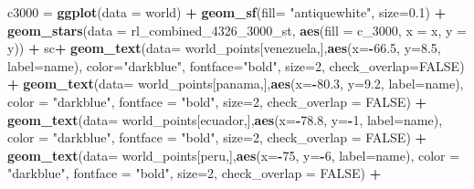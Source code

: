 \documentclass[12pt,twoside]{reedthesis}
\newenvironment{Shaded}{\begin{snugshade}}{\end{snugshade}}
\newcommand{\DataTypeTok}[1]{\textcolor[rgb]{0.13,0.29,0.53}{#1}}
\newcommand{\DecValTok}[1]{\textcolor[rgb]{0.00,0.00,0.81}{#1}}
\newcommand{\FloatTok}[1]{\textcolor[rgb]{0.00,0.00,0.81}{#1}}
\newcommand{\KeywordTok}[1]{\textcolor[rgb]{0.13,0.29,0.53}{\textbf{#1}}}
\newcommand{\NormalTok}[1]{#1}
\newcommand{\OperatorTok}[1]{\textcolor[rgb]{0.81,0.36,0.00}{\textbf{#1}}}
\newcommand{\OtherTok}[1]{\textcolor[rgb]{0.56,0.35,0.01}{#1}}
\newcommand{\StringTok}[1]{\textcolor[rgb]{0.31,0.60,0.02}{#1}}
\begin{document}
\begin{Shaded}
\begin{Highlighting}[]
\NormalTok{c3000 =}\StringTok{ }\KeywordTok{ggplot}\NormalTok{(}\DataTypeTok{data =}\NormalTok{ world) }\OperatorTok{+}\StringTok{ }
\StringTok{  }\KeywordTok{geom_sf}\NormalTok{(}\DataTypeTok{fill=} \StringTok{"antiquewhite"}\NormalTok{, }\DataTypeTok{size=}\FloatTok{0.1}\NormalTok{) }\OperatorTok{+}\StringTok{ }
\StringTok{  }\KeywordTok{geom_stars}\NormalTok{(}\DataTypeTok{data =}\NormalTok{ rl_combined_}\DecValTok{4326}\NormalTok{_}\DecValTok{3000}\NormalTok{_st, }\KeywordTok{aes}\NormalTok{(}\DataTypeTok{fill =}\NormalTok{ c_}\DecValTok{3000}\NormalTok{, }\DataTypeTok{x =}\NormalTok{ x, }\DataTypeTok{y =}\NormalTok{ y)) }\OperatorTok{+}\StringTok{ }
\StringTok{  }\NormalTok{sc}\OperatorTok{+}
\StringTok{  }\KeywordTok{geom_text}\NormalTok{(}\DataTypeTok{data=}\NormalTok{ world_points[venezuela,],}\KeywordTok{aes}\NormalTok{(}\DataTypeTok{x=}\OperatorTok{-}\FloatTok{66.5}\NormalTok{, }\DataTypeTok{y=}\FloatTok{8.5}\NormalTok{, }\DataTypeTok{label=}\NormalTok{name), }\DataTypeTok{color=}\StringTok{"darkblue"}\NormalTok{, }\DataTypeTok{fontface=}\StringTok{"bold"}\NormalTok{, }\DataTypeTok{size=}\DecValTok{2}\NormalTok{, }\DataTypeTok{check_overlap=}\OtherTok{FALSE}\NormalTok{) }\OperatorTok{+}
\StringTok{  }\KeywordTok{geom_text}\NormalTok{(}\DataTypeTok{data=}\NormalTok{ world_points[panama,],}\KeywordTok{aes}\NormalTok{(}\DataTypeTok{x=}\OperatorTok{-}\FloatTok{80.3}\NormalTok{, }\DataTypeTok{y=}\FloatTok{9.2}\NormalTok{, }\DataTypeTok{label=}\NormalTok{name), }\DataTypeTok{color =} \StringTok{"darkblue"}\NormalTok{, }\DataTypeTok{fontface =} \StringTok{"bold"}\NormalTok{, }\DataTypeTok{size=}\DecValTok{2}\NormalTok{, }\DataTypeTok{check_overlap =} \OtherTok{FALSE}\NormalTok{) }\OperatorTok{+}\StringTok{ }
\StringTok{  }\KeywordTok{geom_text}\NormalTok{(}\DataTypeTok{data=}\NormalTok{ world_points[ecuador,],}\KeywordTok{aes}\NormalTok{(}\DataTypeTok{x=}\OperatorTok{-}\FloatTok{78.8}\NormalTok{, }\DataTypeTok{y=}\OperatorTok{-}\DecValTok{1}\NormalTok{, }\DataTypeTok{label=}\NormalTok{name), }\DataTypeTok{color =} \StringTok{"darkblue"}\NormalTok{, }\DataTypeTok{fontface =} \StringTok{"bold"}\NormalTok{, }\DataTypeTok{size=}\DecValTok{2}\NormalTok{, }\DataTypeTok{check_overlap =} \OtherTok{FALSE}\NormalTok{) }\OperatorTok{+}
\StringTok{  }\KeywordTok{geom_text}\NormalTok{(}\DataTypeTok{data=}\NormalTok{ world_points[peru,],}\KeywordTok{aes}\NormalTok{(}\DataTypeTok{x=}\OperatorTok{-}\DecValTok{75}\NormalTok{, }\DataTypeTok{y=}\OperatorTok{-}\DecValTok{6}\NormalTok{, }\DataTypeTok{label=}\NormalTok{name), }\DataTypeTok{color =} \StringTok{"darkblue"}\NormalTok{, }\DataTypeTok{fontface =} \StringTok{"bold"}\NormalTok{, }\DataTypeTok{size=}\DecValTok{2}\NormalTok{, }\DataTypeTok{check_overlap =} \OtherTok{FALSE}\NormalTok{) }\OperatorTok{+}

\end{Highlighting}
\end{Shaded}
\end{document}
